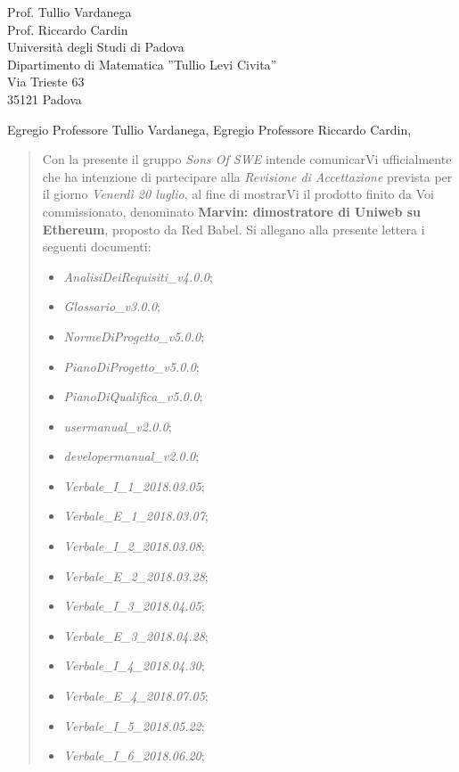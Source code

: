\documentclass{letter}
\newcommand{\gruppo}{\emph{Sons Of SWE}}
\newcommand{\AdR}{\emph{AnalisiDeiRequisiti\_v4.0.0}}
\newcommand{\NdP}{\emph{NormeDiProgetto\_v5.0.0}}
\newcommand{\PdP}{\emph{PianoDiProgetto\_v5.0.0}}
\newcommand{\PdQ}{\emph{PianoDiQualifica\_v5.0.0}}
\newcommand{\G}{\emph{Glossario\_v3.0.0}}
\newcommand{\MU}{\emph{usermanual\_v2.0.0}}
\newcommand{\MS}{\emph{developermanual\_v2.0.0}}
\newcommand{\VIuno}{\emph{Verbale\_I\_1\_2018.03.05}}
\newcommand{\VEuno}{\emph{Verbale\_E\_1\_2018.03.07}}
\newcommand{\VIdue}{\emph{Verbale\_I\_2\_2018.03.08}}
\newcommand{\VEdue}{\emph{Verbale\_E\_2\_2018.03.28}}
\newcommand{\VItre}{\emph{Verbale\_I\_3\_2018.04.05}}
\newcommand{\VEtre}{\emph{Verbale\_E\_3\_2018.04.28}}
\newcommand{\VIsei}{\emph{Verbale\_I\_6\_2018.06.20}}
\begin{document}
	

	
\begin{letter} {   
	\hfill Prof. Tullio Vardanega\\
	\hfill Prof. Riccardo Cardin\\
	\hfill Università degli Studi di Padova \\
	\hfill Dipartimento di Matematica ''Tullio Levi Civita'' \\
	\hfill Via Trieste 63 \\
	\hfill 35121 Padova \\
}

\date{}
\opening{Egregio Professore Tullio Vardanega, \newline Egregio Professore Riccardo Cardin,}
\begin{quotation}
	\noindent Con la presente il gruppo \textit{\gruppo} intende comunicarVi ufficialmente che ha intenzione di partecipare alla \emph{Revisione di Accettazione} prevista per il giorno \emph{Venerdì 20 luglio}, al fine di mostrarVi il prodotto finito da Voi commissionato, denominato \textbf{Marvin: dimostratore di Uniweb su Ethereum}, proposto da Red Babel.
	Si allegano alla presente lettera i seguenti documenti:
	\begin{itemize}
		\item \AdR{};
		\item \G{};
		\item \NdP{};
		\item \PdP{};
		\item \PdQ{};
		\item \MU{};
		\item \MS{};
		\item \VIuno{};
		\item \VEuno{};
		\item \VIdue{};
		\item \VEdue{};
		\item \VItre{};
		\item \VEtre{};
		\item \emph{Verbale\_I\_4\_2018.04.30};
		\item \emph{Verbale\_E\_4\_2018.07.05};
		\item \emph{Verbale\_I\_5\_2018.05.22};
		\item \VIsei{};
	\end{itemize}


\end{quotation}
\end{letter}
\end{document}
